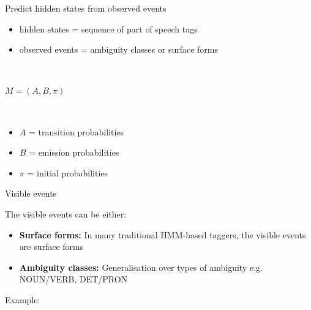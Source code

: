 \documentclass{beamer}
\begin{document}
\begin{frame}


Predict hidden states from observed events
\begin{itemize}
\item hidden states = sequence of part of speech tags
\item observed events = ambiguity classes or surface forms
\end{itemize}
~\\
\begin{center}
{\Large $M = (A, B, \pi)$}
\end{center}
~\\
\begin{itemize}
  \item $A$ = transition probabilities
  \item $B$ = emission probabilities
  \item $\pi$ = initial probabilities
\end{itemize}

\end{frame}



\begin{frame}{Visible events}

The visible events can be either:

\begin{itemize}
  \item \textbf{Surface forms:} In many traditional HMM-based taggers, the visible events are 
    surface forms
  \item \textbf{Ambiguity classes:} Generalisation over types of ambiguity e.g. NOUN/VERB, DET/PRON
\end{itemize}

Example:
\begin{center}
\end{center}

\end{frame}

\end{document}
